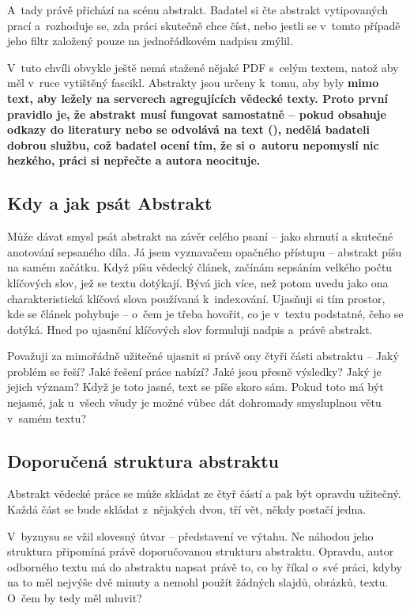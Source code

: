 A~tady právě přichází na scénu abstrakt. Badatel si čte abstrakt vytipovaných prací a~rozhoduje se, zda práci skutečně chce číst, nebo jestli se v~tomto případě jeho filtr založený pouze na jednořádkovém nadpisu zmýlil.

V~tuto chvíli obvykle ještě nemá stažené nějaké PDF s~celým textem, natož aby měl v~ruce vytištěný fascikl. Abstrakty jsou určeny k~tomu, aby byly \bf mimo text\rm , aby ležely na serverech agregujících vědecké texty. Proto první pravidlo je, že abstrakt musí fungovat samostatně -- pokud obsahuje odkazy do literatury nebo se odvolává na text (), nedělá badateli dobrou službu, což badatel ocení tím, že si o~autoru nepomyslí nic hezkého, práci si nepřečte a autora neocituje.

\subsection*{Kdy a jak psát Abstrakt}
Může dávat smysl psát abstrakt na závěr celého psaní -- jako shrnutí a skutečné anotování sepsaného díla. Já jsem vyznavačem opačného přístupu -- abstrakt píšu na samém začátku. Když píšu vědecký článek, začínám sepsáním velkého počtu klíčových slov, jež se textu dotýkají. Bývá jich více, než potom uvedu jako ona charakteristická klíčová slova používaná k~indexování. Ujasňuji si tím prostor, kde se článek pohybuje -- o~čem je třeba hovořit, co je v~textu podstatné, čeho se dotýká. Hned po ujasnění klíčových slov formuluji nadpis a~právě abstrakt. 

Považuji za mimořádně užitečné ujasnit si právě ony čtyři části abstraktu -- Jaký problém se řeší? Jaké řešení práce nabízí? Jaké jsou přesně výsledky? Jaký je jejich význam? Když je toto jasné, text se píše skoro sám. Pokud toto má být nejasné, jak u~všech všudy je možné vůbec dát dohromady smysluplnou větu v~samém textu?

\subsection*{Doporučená struktura abstraktu}
Abstrakt vědecké práce se může skládat ze čtyř částí a pak být opravdu užitečný. Každá část se bude skládat z~nějakých dvou, tří vět, někdy postačí jedna.

V~byznysu se vžil slovesný útvar  -- představení ve výtahu. Ne náhodou jeho struktura připomíná právě doporučovanou strukturu abstraktu. Opravdu, autor odborného textu má do abstraktu napsat právě to, co by říkal o~své práci, kdyby na to měl nejvýše dvě minuty a nemohl použít žádných slajdů, obrázků, textu. O~čem by tedy měl mluvit?

